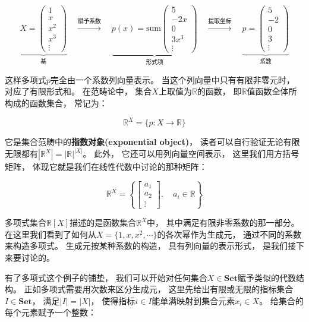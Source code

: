 \documentclass[10pt, openany]{book}
\begin{document}
\begin{equation}
\underbrace{X=\begin{pmatrix}1 \\ x \\ x^2 \\ x^3 \\ \vdots \end{pmatrix}}_{\text{基}}
\quad \xrightarrow{\text{赋予系数}} \quad
\underbrace{p(x)=\text{sum}\begin{pmatrix}5 \\ -2 x \\ 0 \\ 3 x^3 \\ \vdots\end{pmatrix}}_{\text{形式项}}
\quad \xrightarrow{\text{提取坐标}} \quad
\underbrace{p=\begin{pmatrix}5 \\ -2 \\ 0 \\ 3 \\ \vdots\end{pmatrix}}_{\text{系数}}
\end{equation}\label{eq:polynomial-vector}

这样多项式$p$完全由一个系数列向量表示。
当这个列向量中只有有限非零元时，
对应了有限形式和。
在范畴论中，
集合$X$上取值为$\mathbb R$的函数，
即$\mathbb R$值函数全体所构成的函数集合，
常记为：

$$
\mathbb R^X = \{p: X \to \mathbb R \} 
$$

它是集合范畴中的\textbf{指数对象(exponential object)}，
读者可以自行验证无论有限无限都有$|\mathbb R^X| = |\mathbb R| ^ {|X|}$。
此外，
它还可以用列向量空间表示，
这里我们用方括号矩阵，
体现它就是我们在线性代数中讨论的那种矩阵：

$$
\mathbb R^X = \left\{ \begin{bmatrix} a_1 \\ a_2 \\ \vdots \end{bmatrix}, \quad a_i \in \mathbb R \right\}
$$

多项式集合$\mathbb R[X]$描述的是函数集合$\mathbb R^X$中，
其中满足有限非零系数的那一部分。
在这里我们看到了如何从$X = \{1,x,x^2,\cdots\}$的各次幂作为生成元，
通过不同的系数来构造多项式。
生成元按某种系数的构造，
具有列向量的表示形式，
是我们接下来要讨论的。

有了多项式这个例子的铺垫，
我们可以开始对任何集合$X\in\textbf{Set}$赋予类似的代数结构。
正如多项式需要用次数来区分生成元，
这里先给出有限或无限的指标集合$I\in\textbf{Set}$，
满足$|I| = |X|$，
使得指标$i\in I$能单满映射到集合元素$x_i\in X$。
给集合的每个元素赋予一个整数：
\end{document}

